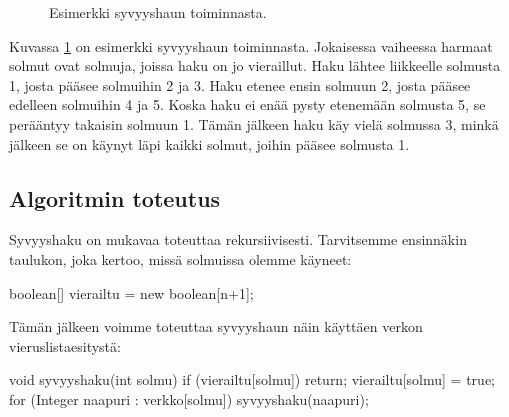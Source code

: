 \begin{figure}
\begin{center}
\end{center}
\caption{Esimerkki syvyyshaun toiminnasta.}
\label{fig:syvhak}
\end{figure}

Kuvassa \ref{fig:syvhak} on esimerkki syvyyshaun toiminnasta.
Jokaisessa vaiheessa harmaat solmut ovat solmuja,
joissa haku on jo vieraillut.
Haku lähtee liikkeelle solmusta 1,
josta pääsee solmuihin 2 ja 3.
Haku etenee ensin solmuun 2, josta pääsee edelleen
solmuihin 4 ja 5.
Koska haku ei enää pysty etenemään solmusta 5,
se perääntyy takaisin solmuun 1.
Tämän jälkeen haku käy vielä solmussa 3,
minkä jälkeen se on käynyt läpi kaikki solmut,
joihin pääsee solmusta 1.

\subsection{Algoritmin toteutus}

Syvyyshaku on mukavaa toteuttaa rekursiivisesti.
Tarvitsemme ensinnäkin taulukon, joka kertoo,
missä solmuissa olemme käyneet:

\begin{code}
boolean[] vierailtu = new boolean[n+1];
\end{code}

Tämän jälkeen voimme toteuttaa syvyyshaun näin
käyttäen verkon vieruslistaesitystä:

\begin{code}
void syvyyshaku(int solmu) {
    if (vierailtu[solmu]) return;
    vierailtu[solmu] = true;
    for (Integer naapuri : verkko[solmu]) {
        syvyyshaku(naapuri);
    }
}
\end{code}

